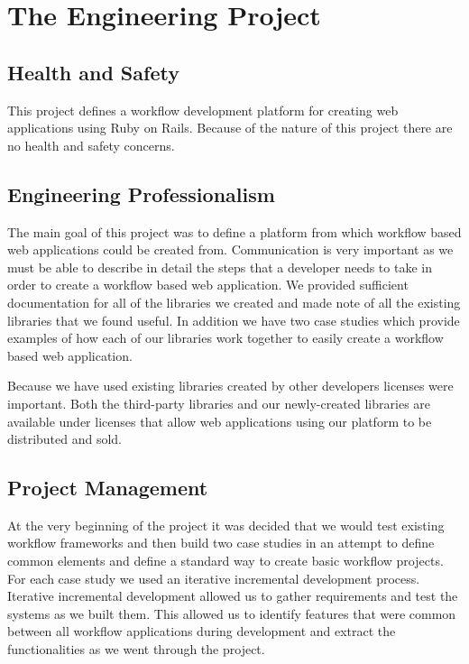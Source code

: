 \documentclass[document.tex]{subfiles}
\begin{document}
\chapter{The Engineering Project}
\label {ch:engineering}

\section{Health and Safety}

This project defines a workflow development platform for creating web applications using Ruby on Rails. Because of the nature of this project there are no health and safety concerns.

\section{Engineering Professionalism}

The main goal of this project was to define a platform from which workflow based web applications could be created from. Communication is very important as we must be able to describe in detail the steps that a developer needs to take in order to create a workflow based web application. We provided sufficient documentation for all of the libraries we created and made note of all the existing libraries that we found useful. In addition we have two case studies which provide examples of how each of our libraries work together to easily create a workflow based web application.

Because we have used existing libraries created by other developers licenses were important. Both the third-party libraries and our newly-created libraries are available under licenses that allow web applications using our platform to be distributed and sold.

\section{Project Management}

At the very beginning of the project it was decided that we would test existing workflow frameworks and then build two case studies in an attempt to define common elements and define a standard way to create basic workflow projects. For each case study we used an iterative incremental development process. Iterative incremental development allowed us to gather requirements and test the systems as we built them. This allowed us to identify features that were common between all workflow applications during development and extract the functionalities as we went through the project.
\end{document}
